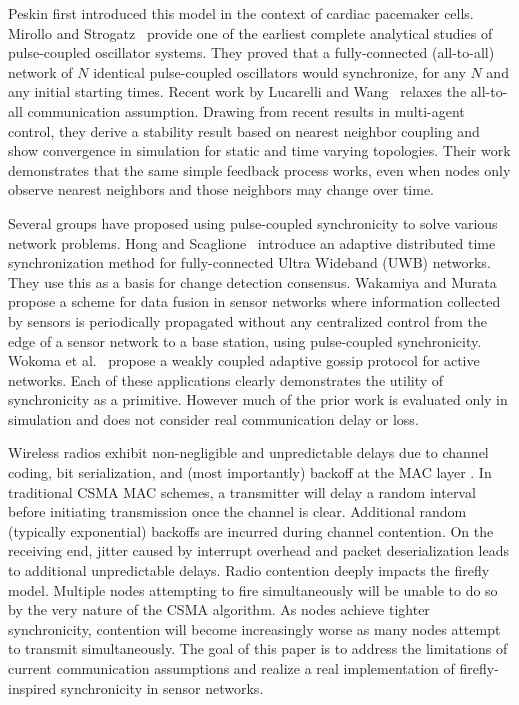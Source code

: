 Peskin first introduced this model in the context of cardiac pacemaker
cells\cite{peskin75}. Mirollo and Strogatz~\cite{strogatz} provide one
of the earliest complete analytical studies of pulse-coupled
oscillator systems. They proved that a fully-connected (all-to-all)
network of $N$ identical pulse-coupled oscillators would synchronize,
for any $N$ and any initial starting times. Recent work by Lucarelli
and Wang~\cite{lucarelli04} relaxes the all-to-all communication
assumption. Drawing from recent results in multi-agent control, they
derive a stability result based on nearest neighbor coupling and show
convergence in simulation for static and time varying
topologies. Their work demonstrates that the same simple feedback
process works, even when nodes only observe nearest neighbors and
those neighbors may change over time.

Several groups have proposed using pulse-coupled synchronicity to
solve various network problems. Hong and
Scaglione~\cite{tsrbc03,hcs04} introduce an adaptive distributed time
synchronization method for fully-connected Ultra Wideband (UWB)
networks. They use this as a basis for change detection
consensus. Wakamiya and Murata~\cite{wm04} propose a scheme for data
fusion in sensor networks where information collected by sensors is
periodically propagated without any centralized control from the edge
of a sensor network to a base station, using pulse-coupled
synchronicity. Wokoma et al.~\cite{wl02} propose a weakly coupled
adaptive gossip protocol for active networks. Each
of these applications clearly demonstrates the utility of
synchronicity as a primitive. However much of the prior work is
evaluated only in simulation and does not consider real communication
delay or loss.

Wireless radios exhibit non-negligible and unpredictable delays due to
channel coding, bit serialization, and (most importantly) backoff at
the MAC layer \cite{tpsn,ftsp}. In traditional CSMA MAC schemes, a
transmitter will delay a random interval before initiating
transmission once the channel is clear. Additional random (typically
exponential) backoffs are incurred during channel contention.  On the
receiving end, jitter caused by interrupt overhead and packet
deserialization leads to additional unpredictable delays.  Radio
contention deeply impacts the firefly model.  Multiple nodes
attempting to fire simultaneously will be unable to do so by the very
nature of the CSMA algorithm. As nodes achieve tighter synchronicity,
contention will become increasingly worse as many nodes attempt to
transmit simultaneously. The goal of this paper is to address the
limitations of current communication assumptions and realize a real
implementation of firefly-inspired synchronicity in sensor networks.

